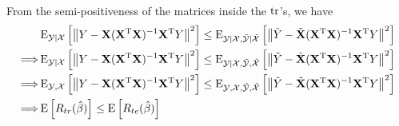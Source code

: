 \begin{sol}
\begin{align*}
\end{align*}
From the semi-positiveness of the matrices inside the $\operatorname{tr}$'s, we have
\begin{align*}
& \operatorname{E}_{\mathcal{Y}\vert \mathcal{X}}\left[\left\|Y-\mathbf{X}(\mathbf{X}^\mathrm{T}\mathbf{X})^{-1}\mathbf{X}^\mathrm{T}Y\right\|^2\right]
\le
\operatorname{E}_{\mathcal{Y}\vert \mathcal{X},\tilde{\mathcal{Y}}\vert \tilde{\mathcal{X}}}\left[\left\|\tilde{Y}-\tilde{\mathbf{X}}(\mathbf{X}^\mathrm{T}\mathbf{X})^{-1}\mathbf{X}^\mathrm{T}Y\right\|^2\right]\\
\Longrightarrow& 
\operatorname{E}_{\mathcal{Y}\vert \mathcal{X}}\left[\left\|Y-\mathbf{X}(\mathbf{X}^\mathrm{T}\mathbf{X})^{-1}\mathbf{X}^\mathrm{T}Y\right\|^2\right]
\le
\operatorname{E}_{\mathcal{Y}\vert \mathcal{X},\tilde{\mathcal{Y}}, \tilde{\mathcal{X}}}\left[\left\|\tilde{Y}-\tilde{\mathbf{X}}(\mathbf{X}^\mathrm{T}\mathbf{X})^{-1}\mathbf{X}^\mathrm{T}Y\right\|^2\right] \\
\Longrightarrow& 
\operatorname{E}_{\mathcal{Y}, \mathcal{X}}\left[\left\|Y-\mathbf{X}(\mathbf{X}^\mathrm{T}\mathbf{X})^{-1}\mathbf{X}^\mathrm{T}Y\right\|^2\right]
\le
\operatorname{E}_{\mathcal{Y}, \mathcal{X},\tilde{\mathcal{Y}}, \tilde{\mathcal{X}}}\left[\left\|\tilde{Y}-\tilde{\mathbf{X}}(\mathbf{X}^\mathrm{T}\mathbf{X})^{-1}\mathbf{X}^\mathrm{T}Y\right\|^2\right] \\
\Longrightarrow& \operatorname{E}\left[R_{tr}(\hat{\beta})\right] \le \operatorname{E}\left[R_{te}(\hat{\beta})\right]
\end{align*}
\end{sol}
